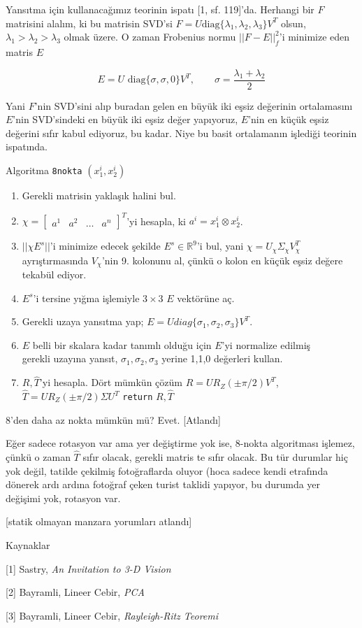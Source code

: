 \documentclass[12pt,fleqn]{article}\usepackage{../../common}
\begin{document}
Yansıtma için kullanacağımız teorinin ispatı [1, sf. 119]'da. Herhangi bir $F$
matrisini alalım, ki bu matrisin SVD'si $F = U \textrm{diag}
\{\lambda_1,\lambda_2,\lambda_3\} V^T$ olsun, $\lambda_1 > \lambda_2 >
\lambda_3$ olmak üzere. O zaman Frobenius normu $|| F - E||_f^2$'i minimize eden
matris $E$

$$ E = U \textrm{ diag}\{\sigma,\sigma,0\} V^T , \qquad \sigma = \frac{\lambda_1+\lambda_2}{2}$$

Yani $F$'nin SVD'sini alıp buradan gelen en büyük iki eşsiz değerinin
ortalamasını $E$'nin SVD'sindeki en büyük iki eşsiz değer yapıyoruz, $E$'nin en
küçük eşsiz değerini sıfır kabul ediyoruz, bu kadar. Niye bu basit ortalamanın
işlediği teorinin ispatında.

Algoritma \verb!8nokta! $\left(x_1^i,x_2^i\right)$
\begin{enumerate}
  \item Gerekli matrisin yaklaşık halini bul.
  \item $\chi = \left[\begin{array}{cccc} a^1 & a^2 & \dots & a^n \end{array}\right]^T$'yi hesapla,  ki $a^i = x_1^i \otimes x_2^i$.
  \item $||\chi E^s||$'i minimize edecek şekilde $E^s \in \mathbb{R}^9$'i bul, yani
    $\chi = U_\chi \Sigma_\chi V_\chi^T$ ayrıştırmasında $V_\chi$'nin 9. kolonunu al,
    çünkü o kolon en küçük eşsiz değere tekabül ediyor. 
  \item $E^s$'i tersine yığma işlemiyle $3 \times 3$ $E$ vektörüne aç. 
  \item Gerekli uzaya yansıtma yap; $E = U diag\{\sigma_1,\sigma_2,\sigma_3\} V^T $.
  \item  $E$ belli bir skalara kadar tanımlı olduğu için $E$'yi normalize edilmiş \\
    gerekli uzayına yansıt, $\sigma_1,\sigma_2,\sigma_3$ yerine 1,1,0 değerleri kullan.
  \item $R,\hat{T}$'yi hesapla. Dört mümkün çözüm $R=UR_Z(\pm \pi/2)V^T$,$\hat{T}=UR_Z(\pm\pi/2)\Sigma U^T$
  \verb!return! $R,\hat{T}$ 
\end{enumerate}


8'den daha az nokta mümkün mü? Evet. [Atlandı]

Eğer sadece rotasyon var ama yer değiştirme yok ise, 8-nokta algoritması
işlemez, çünkü o zaman $\hat{T}$ sıfır olacak, gerekli matris te sıfır
olacak. Bu tür durumlar hiç yok değil, tatilde çekilmiş fotoğraflarda oluyor
(hoca sadece kendi etrafında dönerek ardı ardına fotoğraf çeken turist taklidi
yapıyor, bu durumda yer değişimi yok, rotasyon var.

[statik olmayan manzara yorumları atlandı]

Kaynaklar 

[1] Sastry, {\em An Invitation to 3-D Vision}

[2] Bayramli, Lineer Cebir, {\em PCA}

[3] Bayramli, Lineer Cebir, {\em Rayleigh-Ritz Teoremi}
\end{document}
